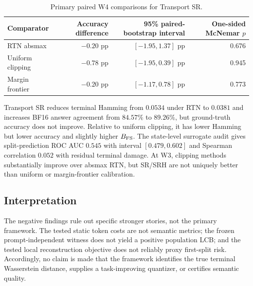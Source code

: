 \begin{table}[ht]
\caption{Primary paired W4 comparisons for Transport SR.}
\label{tab:app-trcal-paired}
\centering\small
\begin{tabular}{@{}lrrr@{}}
\toprule
Comparator & Accuracy difference & 95\% paired-bootstrap interval & One-sided McNemar $p$ \\
\midrule
RTN absmax & $-0.20$ pp & $[-1.95,1.37]$ pp & 0.676 \\
Uniform clipping & $-0.78$ pp & $[-1.95,0.39]$ pp & 0.945 \\
Margin frontier & $-0.20$ pp & $[-1.17,0.78]$ pp & 0.773 \\
\bottomrule
\end{tabular}
\end{table}

Transport SR reduces terminal Hamming from $0.0534$ under RTN to $0.0381$ and increases BF16 answer agreement from $84.57\%$ to $89.26\%$, but ground-truth accuracy does not improve. Relative to uniform clipping, it has lower Hamming but lower accuracy and slightly higher $B_{\rm FS}$. The state-level surrogate audit gives split-prediction ROC AUC $0.545$ with interval $[0.479,0.602]$ and Spearman correlation $0.052$ with residual terminal damage. At W3, clipping methods substantially improve over absmax RTN, but SR/SRH are not uniquely better than uniform or margin-frontier calibration.

\subsection{Interpretation}
The negative findings rule out specific stronger stories, not the primary framework. The tested static token costs are not semantic metrics; the frozen prompt-independent witness does not yield a positive population LCB; and the tested local reconstruction objective does not reliably proxy first-split risk. Accordingly, no claim is made that the framework identifies the true terminal Wasserstein distance, supplies a task-improving quantizer, or certifies semantic quality.
